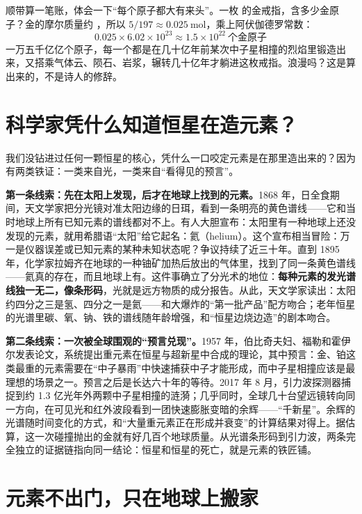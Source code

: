 顺带算一笔账，体会一下“每个原子都大有来头”。一枚  的金戒指，含多少金原子？金的摩尔质量约 ，所以 $5/197 \approx 0.025\ \mathrm{mol}$，乘上阿伏伽德罗常数：
\[0.025 \times 6.02\times 10^{23} \approx 1.5\times 10^{22}\ \text{个金原子}\]
一万五千亿亿个原子，每一个都是在几十亿年前某次中子星相撞的烈焰里锻造出来，又搭乘气体云、陨石、岩浆，辗转几十亿年才躺进这枚戒指。浪漫吗？这是算出来的，不是诗人的修辞。

\section{科学家凭什么知道恒星在造元素？}

我们没钻进过任何一颗恒星的核心，凭什么一口咬定元素是在那里造出来的？因为有两类铁证：一类来自光，一类来自“看得见的预言”。

\begin{zhengju}
\textbf{第一条线索：先在太阳上发现，后才在地球上找到的元素。}1868 年，日全食期间，天文学家把分光镜对准太阳边缘的日珥，看到一条明亮的黄色谱线——它和当时地球上所有已知元素的谱线都对不上。有人大胆宣布：太阳里有一种地球上还没发现的元素，就用希腊语“太阳”给它起名：氦（helium）。这个宣布相当冒险：万一是仪器误差或已知元素的某种未知状态呢？争议持续了近三十年。直到 1895 年，化学家拉姆齐在地球的一种铀矿加热后放出的气体里，找到了同一条黄色谱线——氦真的存在，而且地球上有。这件事确立了分光术的地位：\textbf{每种元素的发光谱线独一无二，像条形码}，光就是远方物质的成分报告。从此，天文学家读出：太阳约四分之三是氢、四分之一是氦——和大爆炸的“第一批产品”配方吻合；老年恒星的光谱里碳、氧、钠、铁的谱线随年龄增强，和“恒星边烧边造”的剧本吻合。

\textbf{第二条线索：一次被全球围观的“预言兑现”。}1957 年，伯比奇夫妇、福勒和霍伊尔发表论文，系统提出重元素在恒星与超新星中合成的理论，其中预言：金、铂这类最重的元素需要在“中子暴雨”中快速捕获中子才能形成，而中子星相撞应该是最理想的场景之一。预言之后是长达六十年的等待。2017 年 8 月，引力波探测器捕捉到约 1.3 亿光年外两颗中子星相撞的涟漪；几乎同时，全球几十台望远镜转向同一方向，在可见光和红外波段看到一团快速膨胀变暗的余辉——“千新星”。余辉的光谱随时间变化的方式，和“大量重元素正在形成并衰变”的计算结果对得上。据估算，这一次碰撞抛出的金就有好几百个地球质量。从光谱条形码到引力波，两条完全独立的证据链指向同一结论：恒星和恒星的死亡，就是元素的铁匠铺。
\end{zhengju}

\section{元素不出门，只在地球上搬家}

